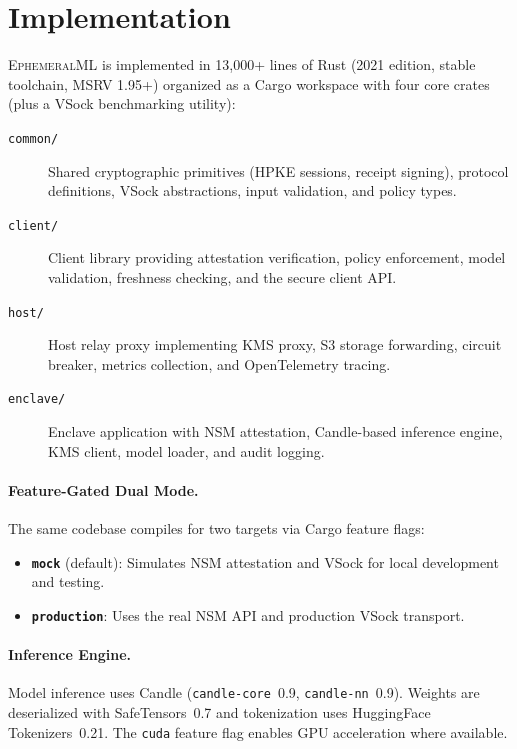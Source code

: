 \documentclass[11pt,a4paper]{article}
\begin{document}
\section{Implementation}
\label{sec:implementation}

\textsc{EphemeralML} is implemented in 13,000+ lines of Rust (2021 edition, stable toolchain, MSRV 1.95+) organized as a Cargo workspace with four core crates (plus a VSock benchmarking utility):

\begin{description}
  \item[\texttt{common/}] Shared cryptographic primitives (HPKE sessions, receipt signing), protocol definitions, VSock abstractions, input validation, and policy types.
  \item[\texttt{client/}] Client library providing attestation verification, policy enforcement, model validation, freshness checking, and the secure client API.
  \item[\texttt{host/}] Host relay proxy implementing KMS proxy, S3 storage forwarding, circuit breaker, metrics collection, and OpenTelemetry tracing.
  \item[\texttt{enclave/}] Enclave application with NSM attestation, Candle-based inference engine, KMS client, model loader, and audit logging.
\end{description}

\paragraph{Feature-Gated Dual Mode.}
The same codebase compiles for two targets via Cargo feature flags:
\begin{itemize}
  \item \textbf{\texttt{mock}} (default): Simulates NSM attestation and VSock for local development and testing.
  \item \textbf{\texttt{production}}: Uses the real NSM API and production VSock transport.
\end{itemize}

\paragraph{Inference Engine.}
Model inference uses Candle (\texttt{candle-core}~0.9, \texttt{candle-nn}~0.9).
Weights are deserialized with SafeTensors~0.7 and tokenization uses HuggingFace Tokenizers~0.21.
The \texttt{cuda} feature flag enables GPU acceleration where available.
\end{document}
